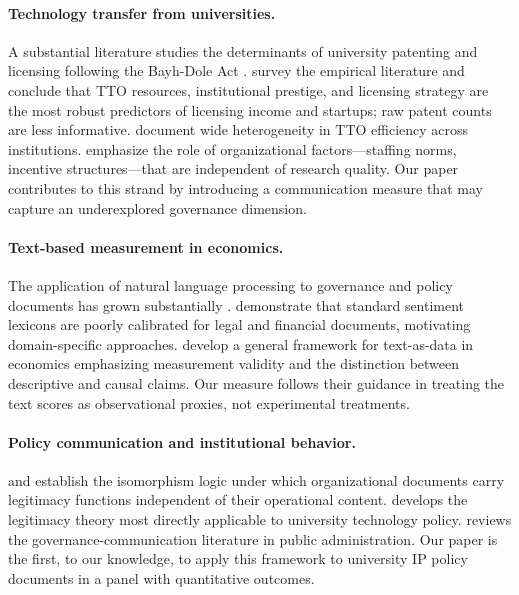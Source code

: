 \documentclass[12pt]{article}
\begin{document}
\paragraph{Technology transfer from universities.}
A substantial literature studies the determinants of university patenting and licensing
following the Bayh-Dole Act \citep{mowery2001, henderson1998, sampat2006}. \citet{dechenaux2011}
survey the empirical literature and conclude that TTO resources, institutional prestige,
and licensing strategy are the most robust predictors of licensing income and startups;
raw patent counts are less informative. \citet{thursby2002} document wide heterogeneity
in TTO efficiency across institutions. \citet{siegel2003, siegel2004} emphasize the role
of organizational factors---staffing norms, incentive structures---that are independent
of research quality. Our paper contributes to this strand by introducing a communication
measure that may capture an underexplored governance dimension.

\paragraph{Text-based measurement in economics.}
The application of natural language processing to governance and policy documents has
grown substantially \citep{gentzkow2019, loughranmcdonald2011, gentzkowkellytaddy2019}.
\citet{loughranmcdonald2011} demonstrate that standard sentiment lexicons are poorly
calibrated for legal and financial documents, motivating domain-specific approaches.
\citet{gentzkowkellytaddy2019} develop a general framework for text-as-data in economics
emphasizing measurement validity and the distinction between descriptive and causal
claims. Our measure follows their guidance in treating the text scores as
observational proxies, not experimental treatments.

\paragraph{Policy communication and institutional behavior.}
\citet{dimaggio1983} and \citet{meyer1977} establish the isomorphism logic under which
organizational documents carry legitimacy functions independent of their operational
content. \citet{suchman1995} develops the legitimacy theory most directly applicable to
university technology policy. \citet{moynihan2015} reviews the governance-communication
literature in public administration. Our paper is the first, to our knowledge, to apply
this framework to university IP policy documents in a panel with quantitative outcomes.
\end{document}
